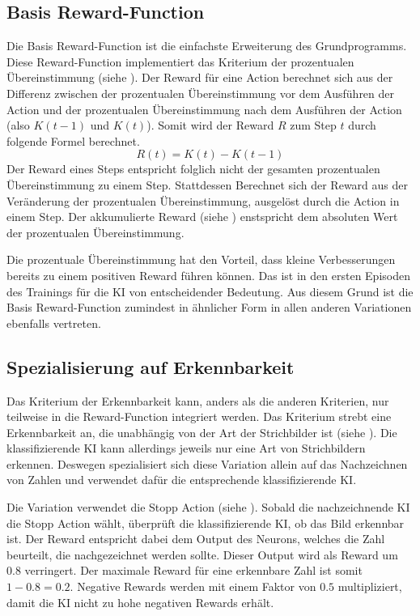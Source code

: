 \subsection{Basis Reward-Function}\label{sub:m_var_base} Die Basis
Reward-Function ist die einfachste Erweiterung des Grundprogramms. Diese
Reward-Function implementiert das Kriterium der prozentualen Übereinstimmung
(siehe ). Der Reward für eine Action berechnet sich
aus der Differenz zwischen der prozentualen Übereinstimmung vor dem Ausführen
der Action und der prozentualen Übereinstimmung nach dem Ausführen der Action
(also $K(t-1)$ und $K(t)$). Somit wird der Reward $R$ zum Step $t$ durch
folgende Formel berechnet.
\[ R(t) = K(t) - K(t-1) \] Der Reward eines Steps entspricht folglich nicht der
gesamten prozentualen Übereinstimmung zu einem Step. Stattdessen Berechnet sich der
Reward aus der Veränderung der prozentualen Übereinstimmung, ausgelöst durch die
Action in einem Step. Der akkumulierte Reward (siehe )
enstspricht dem absoluten Wert der prozentualen Übereinstimmung. 

Die prozentuale Übereinstimmung hat den Vorteil, dass kleine Verbesserungen
bereits zu einem positiven Reward führen können. Das ist in den ersten Episoden
des Trainings für die KI von entscheidender Bedeutung. Aus diesem Grund ist die
Basis Reward-Function zumindest in ähnlicher Form in allen anderen Variationen
ebenfalls vertreten.

\subsection{Spezialisierung auf Erkennbarkeit}\label{sub:m_var_rec} Das
Kriterium der Erkennbarkeit kann, anders als die anderen Kriterien, nur
teilweise in die Reward-Function integriert werden. Das Kriterium strebt eine
Erkennbarkeit an, die unabhängig von der Art der Strichbilder ist (siehe
). Die klassifizierende KI kann allerdings jeweils nur
eine Art von Strichbildern erkennen. Deswegen spezialisiert sich diese Variation
allein auf das Nachzeichnen von Zahlen und verwendet dafür die entsprechende
klassifizierende KI.

Die Variation verwendet die Stopp Action (siehe
). Sobald die nachzeichnende KI die Stopp
Action wählt, überprüft die klassifizierende KI, ob das Bild erkennbar ist. Der
Reward entspricht dabei dem Output des Neurons, welches die Zahl beurteilt, die
nachgezeichnet werden sollte. Dieser Output wird als Reward um $0.8$ verringert.
Der maximale Reward für eine erkennbare Zahl ist somit $1 - 0.8 = 0.2$. Negative
Rewards werden mit einem Faktor von $0.5$ multipliziert, damit die KI nicht zu
hohe negativen Rewards erhält.

